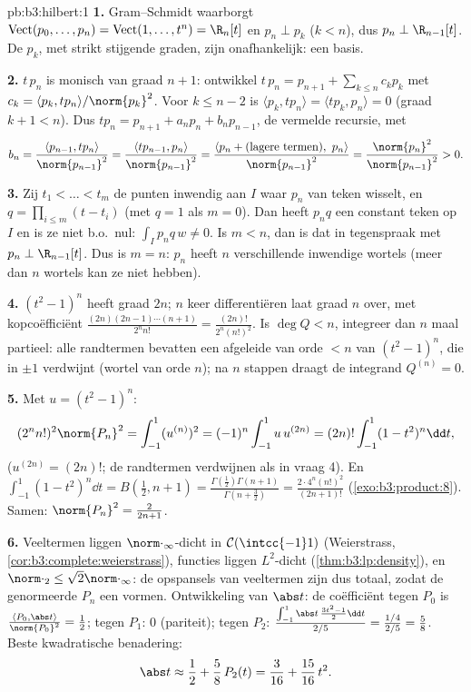 \begin{solution}{pb:b3:hilbert:1}
\textbf{1.} Gram--Schmidt waarborgt
$\operatorname{Vect}(p_0, \dots, p_n) = \operatorname{Vect}(1,
\dots, t^n) = \R_n[t]$ en $p_n \perp p_k$ ($k < n$), dus $p_n
\perp \R_{n-1}[t]$. De $p_k$, met strikt stijgende graden, zijn
onafhankelijk: een basis.

\textbf{2.} $t\,p_n$ is monisch van graad $n + 1$: ontwikkel
$t\,p_n = p_{n+1} + \sum_{k\leq n}c_kp_k$ met $c_k = \langle p_k,
tp_n\rangle/\norm{p_k}^2$. Voor $k \leq n - 2$ is $\langle p_k,
tp_n\rangle = \langle tp_k, p_n\rangle = 0$ (graad $k + 1 < n$).
Dus $tp_n = p_{n+1} + a_np_n + b_np_{n-1}$, de vermelde recursie,
met
\[
b_n = \frac{\langle p_{n-1}, tp_n\rangle}{\norm{p_{n-1}}^2}
= \frac{\langle tp_{n-1}, p_n\rangle}{\norm{p_{n-1}}^2}
= \frac{\langle p_n + (\text{lagere termen}),\
p_n\rangle}{\norm{p_{n-1}}^2}
= \frac{\norm{p_n}^2}{\norm{p_{n-1}}^2} > 0 .
\]

\textbf{3.} Zij $t_1 < \dots < t_m$ de punten inwendig aan $I$
waar $p_n$ van teken wisselt, en $q = \prod_{i\leq m}(t - t_i)$
(met $q = 1$ als $m = 0$). Dan heeft $p_nq$ een constant teken op
$I$ en is ze niet b.o.\ nul: $\int_Ip_nq\,w \neq 0$. Is $m < n$,
dan is dat in tegenspraak met $p_n \perp \R_{n-1}[t]$. Dus is $m
= n$: $p_n$ heeft $n$ verschillende inwendige wortels (meer dan
$n$ wortels kan ze niet hebben).

\textbf{4.} $(t^2 - 1)^n$ heeft graad $2n$; $n$ keer
differentiëren laat graad $n$ over, met kopcoëfficiënt
$\frac{(2n)(2n-1)\cdots(n+1)}{2^nn!} =
\frac{(2n)!}{2^n(n!)^2}$. Is $\deg Q < n$, integreer dan $n$ maal
partieel: alle randtermen bevatten een afgeleide van orde $< n$
van $(t^2-1)^n$, die in $\pm1$ verdwijnt (wortel van orde $n$);
na $n$ stappen draagt de integrand $Q^{(n)} = 0$.

\textbf{5.} Met $u = (t^2 - 1)^n$:
\[
(2^nn!)^2\norm{P_n}^2 = \int_{-1}^1(u^{(n)})^2
= (-1)^n\int_{-1}^1 u\,u^{(2n)}
= (2n)!\int_{-1}^1(1 - t^2)^n\dd t ,
\]
($u^{(2n)} = (2n)!$; de randtermen verdwijnen als in vraag 4). En
$\int_{-1}^1(1-t^2)^n\dd t = B(\tfrac12, n+1) =
\frac{\Gamma(\frac12)\Gamma(n+1)}{\Gamma(n + \frac32)} =
\frac{2\cdot4^n(n!)^2}{(2n+1)!}$
(\cref{exo:b3:product:8}). Samen: $\norm{P_n}^2 = \frac{2}{2n +
1}$.

\textbf{6.} Veeltermen liggen $\norm\cdot_\infty$-dicht in
$\mathcal C(\intcc{-1}1)$ (Weierstrass,
\cref{cor:b3:complete:weierstrass}),  functies liggen
$L^2$-dicht (\cref{thm:b3:lp:density}), en $\norm\cdot_2 \leq
\sqrt2\norm\cdot_\infty$: de opspansels van veeltermen zijn dus
totaal, zodat de genormeerde $P_n$ een  vormen.
Ontwikkeling van $\abs t$: de coëfficiënt tegen $P_0$ is
$\frac{\langle P_0, \abs t\rangle}{\norm{P_0}^2} = \frac12$;
tegen $P_1$: $0$ (pariteit); tegen $P_2$:
$\frac{\int_{-1}^1\abs t\,\frac{3t^2-1}2\dd t}{2/5} =
\frac{1/4}{2/5} = \frac58$. Beste kwadratische benadering:
\[
\abs t \approx \frac12 + \frac58\,P_2(t) = \frac{3}{16} +
\frac{15}{16}\,t^2 .
\]


\end{solution}
